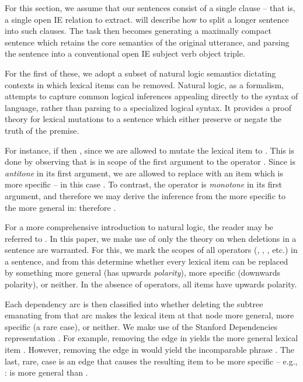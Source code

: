 
For this section, we assume that our sentences consist of a single clause --
  that is, a single open IE relation to extract.
 will describe how to split a longer sentence into such clauses.
The task then becomes generating a maximally compact sentence which retains
  the core semantics of the original utterance, and parsing the sentence
  into a conventional open IE subject verb object triple.

For the first of these, we adopt a subset of natural logic semantics dictating
  contexts in which lexical items can be removed.
Natural logic, as a formalism, attempts to capture common logical inferences
  appealing directly to the syntax of language, rather than parsing to a
  specialized logical syntax.
It provides a proof theory for lexical mutations to a sentence which either
  preserve or negate the truth of the premise.

For instance, if  then 
  , since we are allowed to mutate
  the lexical item  to .
This is done by observing that  is in scope of the first
  argument to the operator .
Since  is \textit{antitone} in its first argument, we are allowed
  to replace  with an item which is more specific -- in this case
  .
To contrast, the operator  is \textit{monotone} in its first argument,
  and therefore we may derive the inference from the more specific
   to the more general  in:
   therefore .

For a more comprehensive introduction to natural logic, the reader may be
  referred to .
In this paper, we make use of only the theory on when deletions in a sentence
  are warranted.
For this, we mark the scopes of all operators (, , ,
  etc.) in a sentence, and from this determine whether every lexical item
  can be replaced by something more general (has upwards \textit{polarity}),
  more specific (downwards polarity), or neither.
In the absence of operators, all items have upwards polarity.

Each dependency arc is then classified into whether deleting the subtree
  emanating from that arc makes the lexical item at that node more general,
  more specific (a rare case), or neither.
We make use of the Stanford Dependencies representation 
  \cite{key:stanford-dependencies}.
For example, removing the  edge in  yields the
  more general lexical item .
However, removing the  edge in  would yield the
  incomparable phrase .
The last, rare, case is an edge that causes the resulting item to be 
  more specific -- e.g., : 
   is more general than .

